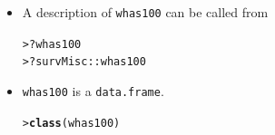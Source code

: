 \documentclass[10pt]{beamer}\usepackage[]{graphicx}\usepackage[]{color}
\makeatletter
\newcommand{\hlopt}[1]{\textcolor[rgb]{0,0,0}{#1}}%
\newcommand{\hlstd}[1]{\textcolor[rgb]{0.345,0.345,0.345}{#1}}%
\newcommand{\hlkwd}[1]{\textcolor[rgb]{0.737,0.353,0.396}{\textbf{#1}}}%
\newenvironment{kframe}{%
 \def\at@end@of@kframe{}%
 \ifinner\ifhmode%
  \def\at@end@of@kframe{\end{minipage}}%
  \begin{minipage}{\columnwidth}%
 \fi\fi%
 \def\FrameCommand##1{\hskip\@totalleftmargin \hskip-\fboxsep
 \colorbox{shadecolor}{##1}\hskip-\fboxsep
     \hskip-\linewidth \hskip-\@totalleftmargin \hskip\columnwidth}%
 \MakeFramed {\advance\hsize-\width
   \@totalleftmargin\z@ \linewidth\hsize
   \@setminipage}}%
 {\par\unskip\endMakeFramed%
 \at@end@of@kframe}
\newenvironment{knitrout}{}{} %
\renewenvironment{knitrout}{\setlength{\topsep}{-.2mm}}{}
\makeatother
\begin{document}
\begin{frame}[fragile]
\begin{itemize}
\begin{knitrout}
\begin{kframe}
{\ttfamily\noindent\bfseries\color{errorcolor}{Error in head(whas100): object 'whas100' not found}}\end{kframe}
\end{knitrout}
\item A description of \texttt{whas100} can be called from
\begin{knitrout}\scriptsize
{}\color{fgcolor}\begin{kframe}
\begin{alltt}
\hlstd{> }\hlopt{?}\hlstd{whas100}
\hlstd{> }\hlopt{?}\hlstd{survMisc}\hlopt{::}\hlstd{whas100}
\end{alltt}
\end{kframe}
\end{knitrout}
   \item \texttt{whas100} is a \texttt{data.frame}. 
\begin{knitrout}\scriptsize
{}\color{fgcolor}\begin{kframe}
\begin{alltt}
\hlstd{> }\hlkwd{class}\hlstd{(whas100)}
\end{alltt}


{\ttfamily\noindent\bfseries\color{errorcolor}{Error in eval(expr, envir, enclos): object 'whas100' not found}}\end{kframe}
\end{knitrout}
  \end{itemize}
\end{frame}
\end{document}
